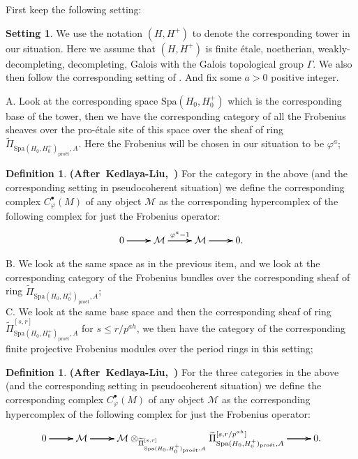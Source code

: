 \documentclass[12pt]{amsart}
\theoremstyle{definition}
\newtheorem{definition}[theorem]{Definition}
\numberwithin{equation}{section}
\newtheorem{setting}[theorem]{Setting}
\begin{document}
\indent First keep the following setting:


\begin{setting}
We use the notation $(H,H^+)$ to denote the corresponding tower in our situation. Here we assume that $(H,H^+)$ is finite \'etale, noetherian, weakly-decompleting, decompleting, Galois with the Galois topological group $\Gamma$. We also then follow the corresponding setting of \cite[Hypothesis 3.1.1]{KL16}. And fix some $a>0$ positive integer.	
\end{setting}



\noindent A. Look at the corresponding space $\mathrm{Spa}(H_0,H_0^+)$ which is the corresponding base of the tower, then we have the corresponding category of all the Frobenius sheaves over the pro-\'etale site of this space over the sheaf of ring $\widetilde{\Pi}_{\mathrm{Spa}(H_0,H_0^+)_\text{pro\'et},A}$. Here the Frobenius will be chosen in our situation to be $\varphi^a$;\\
\begin{definition} \mbox{\bf{(After Kedlaya-Liu, \cite[Definition 4.4.4]{KL16})}} For the category in the above (and the corresponding setting in pseudocoherent situation) we define the corresponding complex $C^\bullet_{\varphi}(M)$ of any object $\mathcal{M}$ as the corresponding hypercomplex of the following complex for just the Frobenius operator:
\[
\xymatrix@R+0pc@C+0pc{
0\ar[r] \ar[r] \ar[r] &\mathcal{M} \ar[r]^{\varphi^a-1} \ar[r] \ar[r]  & \mathcal{M} \ar[r] \ar[r] \ar[r]&0.
}
\]	
\end{definition}






\noindent B. We look at the same space as in the previous item, and we look at the corresponding category of the Frobenius bundles over the corresponding sheaf of ring $\widetilde{\Pi}_{\mathrm{Spa}(H_0,H_0^+)_\text{pro\'et},A}$;\\


\noindent C. We look at the same base space and then the corresponding sheaf of ring $\widetilde{\Pi}^{[s,r]}_{\mathrm{Spa}(H_0,H_0^+)_\text{pro\'et},A}$ for $s\leq r/p^{ah}$, we then have the category of the corresponding finite projective Frobenius modules over the period rings in this setting;


\begin{definition} \mbox{\bf{(After Kedlaya-Liu, \cite[Definition 4.4.4]{KL16})}} For the three categories in the above (and the corresponding setting in pseudocoherent situation) we define the corresponding complex $C^\bullet_{\varphi}(M)$ of any object $\mathcal{M}$ as the corresponding hypercomplex of the following complex for just the Frobenius operator:
\[
\xymatrix@R+0pc@C+0pc{
0\ar[r] \ar[r] \ar[r] &\mathcal{M} \ar[r] \ar[r] \ar[r]  & \mathcal{M}\otimes_{\widetilde{\Pi}^{[s,r]}_{\mathrm{Spa}(H_0,H_0^+)_\text{pro\'et},A}}\widetilde{\Pi}^{[s,r/p^{ah}]}_{\mathrm{Spa}(H_0,H_0^+)_\text{pro\'et},A} \ar[r] \ar[r] \ar[r]&0.
}
\]

	
\end{definition}
\end{document}
